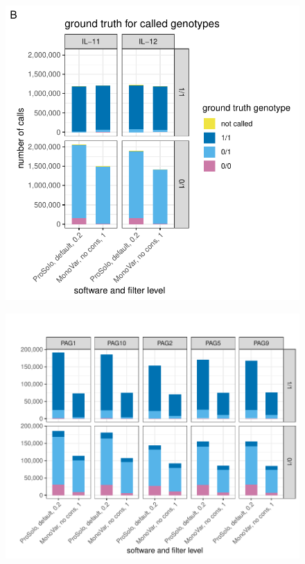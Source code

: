 \documentclass[authoryear,preprint,11pt]{scrartcl}
\begin{document}
\begin{figure}[!tpb]
\begin{minipage}{.53\linewidth}
 \end{minipage}
 \begin{minipage}{.45\linewidth}
  \includegraphics[width=\linewidth]{figs/Dong2017/Dong2017_genotyping_ground_truth_per_calls_prosolo_monovar.pdf} \\
  \end{minipage}
 \begin{minipage}{.53\linewidth}
  \includegraphics[width=\linewidth]{figs/Laehnemann2017/Laehnemann2017_genotyping_ground_truth_per_calls_prosolo_monovar.pdf} \\

\end{minipage}
\end{figure}
\end{document}
